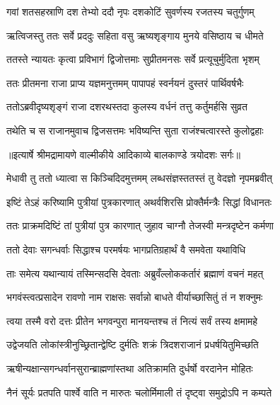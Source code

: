 \twolineshloka
{गवां शतसहस्राणि दश तेभ्यो ददौ नृपः}
{दशकोटिं सुवर्णस्य रजतस्य चतुर्गुणम्} %

\twolineshloka
{ऋत्विजस्तु ततः सर्वे प्रददुः सहिता वसु}
{ऋष्यशृङ्गाय मुनये वसिष्ठाय च धीमते} %

\twolineshloka
{ततस्ते न्यायतः कृत्वा प्रविभागं द्विजोत्तमाः}
{सुप्रीतमनसः सर्वे प्रत्यूचुर्मुदिता भृशम्} %

\twolineshloka
{ततः प्रीतमना राजा प्राप्य यज्ञमनुत्तमम्}
{पापापहं स्वर्नयनं दुस्तरं पार्थिवर्षभैः} %

\twolineshloka
{ततोऽब्रवीदृष्यशृङ्गं राजा दशरथस्तदा}
{कुलस्य वर्धनं तत्तु कर्तुमर्हसि सुव्रत} %

\twolineshloka
{तथेति च स राजानमुवाच द्विजसत्तमः}
{भविष्यन्ति सुता राजंश्चत्वारस्ते कुलोद्वहाः} %


{॥इत्यार्षे श्रीमद्रामायणे वाल्मीकीये आदिकाव्ये बालकाण्डे त्रयोदशः सर्गः॥}


\twolineshloka
{मेधावी तु ततो ध्यात्वा स किञ्चिदिदमुत्तमम्}
{लब्धसंज्ञस्ततस्तं तु वेदज्ञो नृपमब्रवीत्} %

\twolineshloka
{इष्टिं तेऽहं करिष्यामि पुत्रीयां पुत्रकारणात्}
{अथर्वशिरसि प्रोक्तैर्मन्त्रैः सिद्धां विधानतः} %

\twolineshloka
{ततः प्राक्रमदिष्टिं तां पुत्रीयां पुत्र कारणात्}
{जुहाव चाग्नौ तेजस्वी मन्त्रदृष्टेन कर्मणा} %

\twolineshloka
{ततो देवाः सगन्धर्वाः सिद्धाश्च परमर्षयः}
{भागप्रतिग्रहार्थं वै समवेता यथाविधि} %

\twolineshloka
{ताः समेत्य यथान्यायं तस्मिन्सदसि देवताः}
{अब्रुवँल्लोककर्तारं ब्रह्माणं वचनं महत्} %

\twolineshloka
{भगवंस्त्वत्प्रसादेन रावणो नाम राक्षसः}
{सर्वान्नो बाधते वीर्याच्छासितुं तं न शक्नुमः} %

\twolineshloka
{त्वया तस्मै वरो दत्तः प्रीतेन भगवन्पुरा}
{मानयन्तश्च तं नित्यं सर्वं तस्य क्षमामहे} %

\twolineshloka
{उद्वेजयति लोकांस्त्रीनुच्छ्रितान्द्वेष्टि दुर्मतिः}
{शक्रं त्रिदशराजानं प्रधर्षयितुमिच्छति} %

\twolineshloka
{ऋषीन्यक्षान्सगन्धर्वानसुरान्ब्राह्मणांस्तथा}
{अतिक्रामति दुर्धर्षो वरदानेन मोहितः} %

\twolineshloka
{नैनं सूर्यः प्रतपति पार्श्वे वाति न मारुतः}
{चलोर्मिमाली तं दृष्ट्वा समुद्रोऽपि न कम्पते} %

